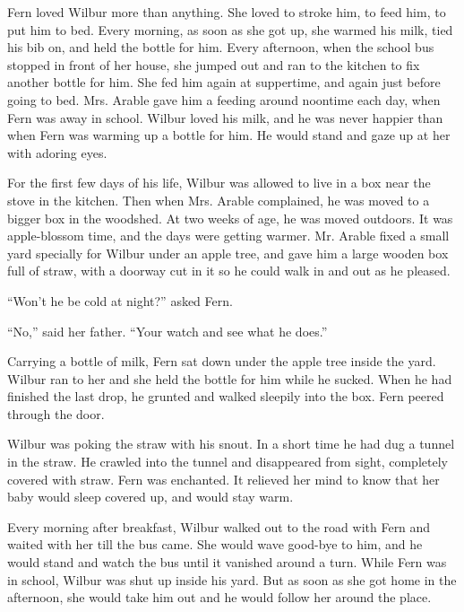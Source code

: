 \documentclass[a4paper, oneside]{book}
\begin{document}
 
 Fern loved Wilbur more than anything. She loved to stroke him,
to feed him, to put him to bed. Every morning, as soon as she got                
up, she warmed his milk, tied his bib on, and held the bottle for
him. Every afternoon, when the school bus stopped in front of her
house, she jumped out and ran to the kitchen to fix another bottle
for him. She fed him again at suppertime, and again just before
going to bed. Mrs. Arable gave him a feeding around noontime
each day, when Fern was away in school. Wilbur loved his milk,
and he was never happier than when Fern was warming up a bottle
for him. He would stand and gaze up at her with adoring eyes. 

For the first few days of his life, Wilbur was allowed to live in a             
box near the stove in the kitchen. Then when Mrs. Arable
complained, he was moved to a bigger box in the woodshed. At two
weeks of age, he was moved outdoors. It was apple-blossom time,
and the days were getting warmer. Mr. Arable fixed a small yard                  
specially for Wilbur under an apple tree, and gave him a large
wooden box full of straw, with a doorway cut in it so he could walk
in and out as he pleased. 

``Won't he be cold at night?'' asked Fern.

 ``No,'' said her father. ``Your watch and see what he does.'' 

  Carrying a bottle of milk, Fern sat down under the apple tree
inside the yard. Wilbur ran to her and she held the bottle for him 
while he sucked. When he had finished the last drop, he grunted
and walked sleepily into the box. Fern peered through the door. 

Wilbur was poking the straw with his snout. In a short time he had
dug a tunnel in the straw. He crawled into the tunnel and
disappeared from sight, completely covered with straw. Fern was
enchanted. It relieved her mind to know that her baby would sleep
covered up, and would stay warm. 

Every morning after breakfast, Wilbur walked out to the road with
Fern and waited with her till the bus came. She would wave
good-bye to him, and he would stand and watch the bus until it
vanished around a turn. While Fern was in school, Wilbur was shut
up inside his yard. But as soon as she got home in the afternoon,
she would take him out and he would follow her around the place. 
\end{document}
